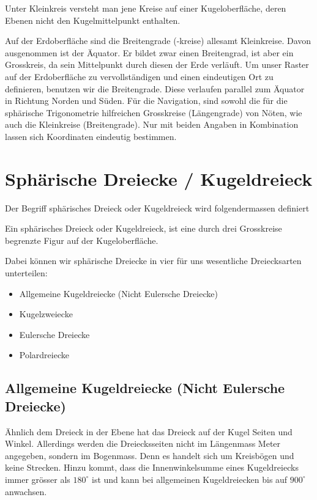 \begin{refsection}
\begin{definition}
Unter Kleinkreis versteht man jene Kreise auf einer Kugeloberfläche, deren Ebenen nicht den Kugelmittelpunkt enthalten.
\label{skript:kugel:satz:Kleinkreis}
\end{definition} 

Auf der Erdoberfläche sind die Breitengrade (-kreise) allesamt Kleinkreise. Davon ausgenommen ist der Äquator. Er bildet zwar einen Breitengrad, ist aber ein Grosskreis, da sein Mittelpunkt durch diesen der Erde verläuft.
Um unser Raster auf der Erdoberfläche zu vervollständigen und einen eindeutigen Ort zu definieren, benutzen wir die Breitengrade. Diese verlaufen parallel zum Äquator in Richtung Norden und Süden.
Für die Navigation, sind sowohl die für die sphärische Trigonometrie hilfreichen Grosskreise (Längengrade) von Nöten, wie auch die Kleinkreise (Breitengrade). Nur mit beiden Angaben in Kombination lassen sich Koordinaten eindeutig bestimmen.



\section{Sphärische Dreiecke / Kugeldreieck}
Der Begriff sphärisches Dreieck oder Kugeldreieck wird folgendermassen definiert

\begin{definition}
Ein sphärisches Dreieck oder Kugeldreieck, ist eine durch drei Grosskreise begrenzte Figur auf der Kugeloberfläche.
\end{definition} 

Dabei können wir sphärische Dreiecke in vier für uns wesentliche Dreiecksarten unterteilen:

\begin{itemize}
\item Allgemeine Kugeldreiecke (Nicht Eulersche Dreiecke)
\item Kugelzweiecke
\item Eulersche Dreiecke
\item Polardreiecke
\end{itemize}


\subsection{Allgemeine Kugeldreiecke (Nicht Eulersche Dreiecke)}
Ähnlich dem Dreieck in der Ebene hat das Dreieck auf der Kugel Seiten und Winkel. Allerdings werden die Dreiecksseiten nicht im Längenmass Meter angegeben, sondern im Bogenmass. Denn es handelt sich um Kreisbögen und keine Strecken.
Hinzu kommt, dass die Innenwinkelsumme eines Kugeldreiecks immer grösser als $180^{\circ}$ ist und kann bei allgemeinen Kugeldreiecken bis auf $900^{\circ}$ anwachsen.


\end{refsection}
